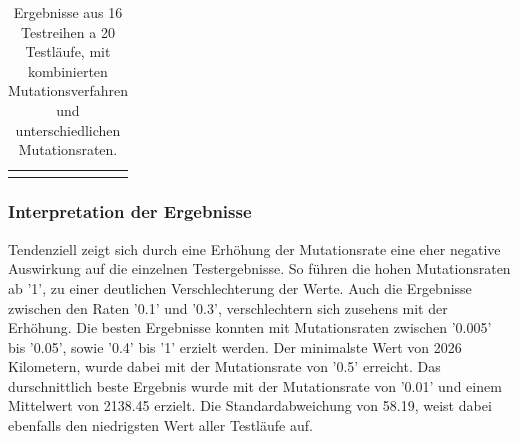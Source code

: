 \begin{table}
\begin{tabularx}{\textwidth}{NXlllll}
		\addlinespace\bottomrule
		\end{tabularx}
	\caption{Ergebnisse aus 16 Testreihen a 20 Testläufe, mit kombinierten Mutationsverfahren und unterschiedlichen Mutationsraten.}
	\label{tbl:aufgabeF-ergebnisse}
\end{table}

\subsubsection{Interpretation der Ergebnisse}
Tendenziell zeigt sich durch eine Erhöhung der Mutationsrate eine eher negative
Auswirkung auf die einzelnen Testergebnisse. So führen die hohen Mutationsraten
ab '1', zu einer deutlichen Verschlechterung der Werte. Auch die Ergebnisse zwischen
den Raten '0.1' und '0.3', verschlechtern sich zusehens mit der Erhöhung.
Die besten Ergebnisse konnten mit Mutationsraten zwischen '0.005' bis '0.05',
sowie '0.4' bis '1' erzielt werden. Der minimalste Wert von 2026 Kilometern, 
wurde dabei mit der Mutationsrate von '0.5' erreicht. Das durschnittlich
beste Ergebnis wurde mit der Mutationsrate von '0.01' und einem Mittelwert von
2138.45 erzielt. Die Standardabweichung von 58.19, weist dabei ebenfalls den 
niedrigsten Wert aller Testläufe auf. 
